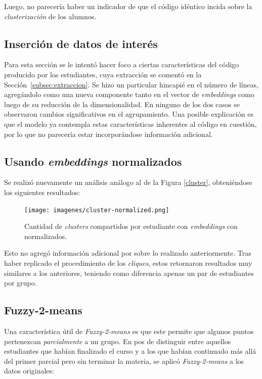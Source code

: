 \documentclass[11pt,a4paper,twoside,openany]{tesis}
\begin{document}
Luego, no parecería haber un indicador de que el código idéntico incida sobre la \emph{clusterización} de los alumnos.


\subsection{Inserción de datos de interés}
Para esta sección se le intentó hacer foco a ciertas características del código producido por los estudiantes, cuya extracción se comentó en la Sección~\ref{subsec:extraccion}. Se hizo un particular hincapié en el número de líneas, agregándolo como una nueva componente tanto en el vector de \emph{embeddings} como luego de su reducción de la dimensionalidad. En ninguno de los dos casos se observaron cambios significativos en el agrupamiento. Una posible explicación es que el modelo ya contempla estas características inherentes al código en cuestión, por lo que no parecería estar incorporándose información adicional. 


\subsection{Usando \emph{embeddings} normalizados}
Se realizó nuevamente un análisis análogo al de la Figura \ref{cluster}, obteniéndose los siguientes resultados:

\begin{figure}[H]
    \centering
    \texttt{[image: imagenes/cluster-normalized.png]}
    \caption{Cantidad de \emph{clusters} compartidos por estudiante con \emph{embeddings} con normalizados.}
\end{figure}

Esto no agregó información adicional por sobre lo realizado anteriormente. Tras haber replicado el procedimiento de los \emph{cliques}, estos retornaron resultados muy similares a los anteriores, teniendo como diferencia apenas un par de estudiantes por grupo. 



\subsection{Fuzzy-2-means}

Una característica útil de \emph{Fuzzy-2-means} es que este permite que algunos puntos pertenezcan \emph{parcialmente} a un grupo. En pos de distinguir entre aquellos estudiantes que habían finalizado el curso y a los que habían continuado más allá del primer parcial pero sin terminar la materia, se aplicó \emph{Fuzzy-2-means} a los datos originales: 
\end{document}
